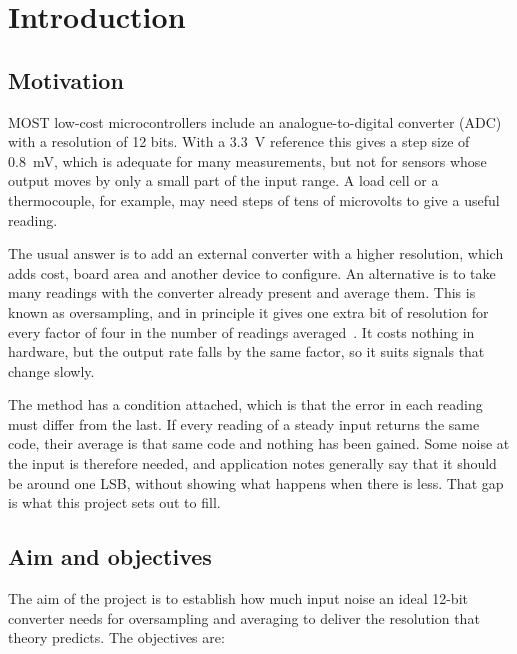 
\section{Introduction}
\label{sec:introduction}

\subsection{Motivation}

\lettrine[lines=2, slope=0em, loversize=0.14, nindent=0pt, lhang=0.3, lraise=0]{M}{OST}
low-cost microcontrollers include an analogue-to-digital converter (ADC) with
a resolution of 12 bits. With a \qty{3.3}{\volt} reference this gives a step
size of \qty{0.8}{\milli\volt}, which is adequate for many measurements, but
not for sensors whose output moves by only a small part of the input range. A
load cell or a thermocouple, for example, may need steps of tens of microvolts
to give a useful reading.

The usual answer is to add an external converter with a higher resolution,
which adds cost, board area and another device to configure. An alternative is
to take many readings with the converter already present and average them.
This is known as oversampling, and in principle it gives one extra bit of
resolution for every factor of four in the number of readings
averaged~\cite{atmel_avr121_2005}. It costs nothing in hardware, but the
output rate falls by the same factor, so it suits signals that change slowly.

The method has a condition attached, which is that the error in each reading
must differ from the last. If every reading of a steady input returns the same
code, their average is that same code and nothing has been gained. Some noise
at the input is therefore needed, and application notes generally say that it
should be around one LSB, without showing what happens when there is less.
That gap is what this project sets out to fill.

\subsection{Aim and objectives}

The aim of the project is to establish how much input noise an ideal 12-bit
converter needs for oversampling and averaging to deliver the resolution that
theory predicts. The objectives are:

